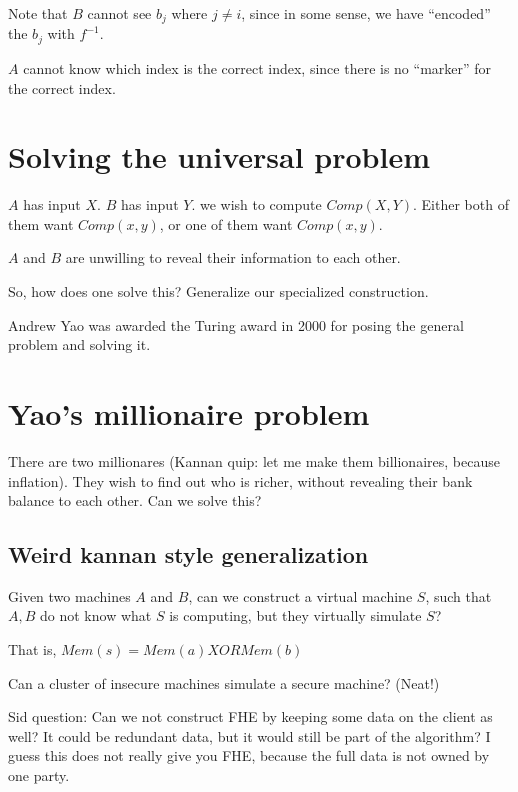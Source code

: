 Note that $B$ cannot see $b_j$ where $j \neq i$, since in some sense, we have ``encoded'' the $b_j$ with  $f^{-1}$.

$A$ cannot know which index is the correct index, since there is no ``marker'' for the correct index.





\section{Solving the universal problem}

$A$ has input $X$. $B$ has input $Y$. we wish to compute $Comp(X, Y)$. Either both of
them want $Comp(x, y)$, or one of them want $Comp(x, y)$.

$A$ and $B$ are unwilling to reveal their information to each other.

So, how does one solve this? Generalize our specialized construction.

Andrew Yao was awarded the Turing award in 2000 for posing the general problem and solving it.


\section{Yao's millionaire problem}

There are two millionares (Kannan quip: let me make them billionaires, because inflation). They wish to
find out who is richer, without revealing their bank balance to each other. Can we solve this?


\subsection{Weird kannan style generalization}

Given two machines $A$ and $B$, can we construct a virtual machine $S$, such that $A, B$ do not know what
$S$ is computing, but they virtually simulate $S$?

That is, $Mem(s) = Mem(a) XOR Mem(b)$

Can a cluster of insecure machines simulate a secure machine? (Neat!)

Sid question: Can we not construct FHE by keeping some data on the client as well? It could be redundant data,
but it would still be part of the algorithm? I guess this does not really give you FHE, because the full data is not
owned by one party.





